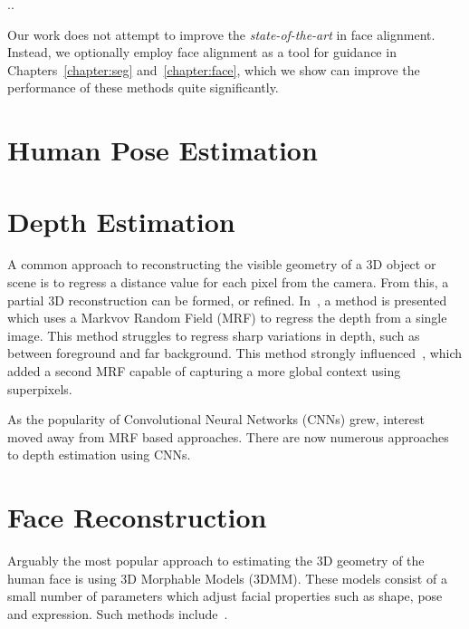 ..


Our work does not attempt to improve the \textit{state-of-the-art} in
face alignment. Instead, we optionally employ face alignment as a tool
for guidance in Chapters~\ref{chapter:seg} and~\ref{chapter:face},
which we show can improve the performance of these methods quite
significantly.





\section{Human Pose Estimation}

\section{Depth Estimation}

A common approach to reconstructing the visible geometry of a 3D
object or scene is to regress a distance value for each pixel from the
camera. From this, a partial 3D reconstruction can be formed, or
refined. In~\cite{saxena2006learning}, a method is presented which
uses a Markvov Random Field (MRF) to regress the depth from a single
image. This method struggles to regress sharp variations in depth,
such as between foreground and far background. This method strongly
influenced~\cite{liu2010single}, which added a second MRF capable of
capturing a more global context using superpixels.

As the popularity of Convolutional Neural Networks (CNNs) grew,
interest moved away from MRF based approaches. There are now numerous
approaches to depth estimation using CNNs.

\section{Face Reconstruction}

Arguably the most popular approach to estimating the 3D geometry of
the human face is using 3D Morphable Models (3DMM). These models
consist of a small number of parameters which adjust facial properties
such as shape, pose and expression. Such methods
include~\cite{jourabloo2016large,huber2016multiresolution,zhu2016face,liu2016joint,tran2018extreme,jiang20183d,jiang2018pose}.

